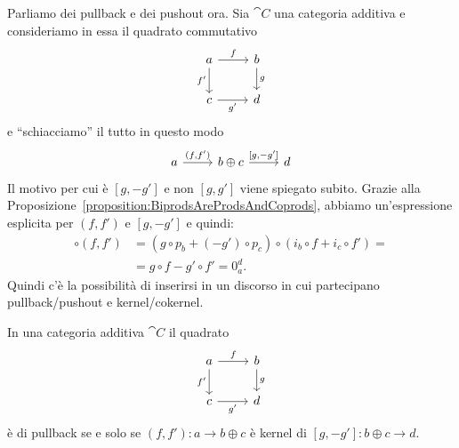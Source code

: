 Parliamo dei pullback e dei pushout ora. Sia \(\cat C\) una categoria
additiva e consideriamo in essa il quadrato commutativo
\[
  \begin{tikzcd}
    a \ar["{f}", r] \ar["{f'}", d, swap] & b \ar["{g}", d] \\
    c \ar["{g'}", r, swap] & d
  \end{tikzcd}
\]
e ``schiacciamo'' il tutto in questo modo
\[
  \begin{tikzcd}
    a \ar["{(f, f')}", r] & b \oplus c \ar["{[g, -g']}", r] & d
  \end{tikzcd}
\]
Il motivo per cui è \([g, -g']\) e non \([g, g']\) viene spiegato
subito. Grazie alla
Proposizione~\ref{proposition:BiprodsAreProdsAndCoprods}, abbiamo
un'espressione esplicita per \((f,f')\) e \([g,-g']\) e quindi:
\begin{align*} [g, -g'] \circ (f, f') &= (g \circ p_b + (-g') \circ p_c)
  \circ (i_b
                                        \circ f + i_c \circ f') = \\
                                      &= g \circ f - g' \circ f' = 0_a^d
                                        .
\end{align*}
Quindi c'è la possibilità di inserirsi in un discorso in cui partecipano
pullback/pushout e kernel/cokernel.

\begin{proposition}\label{proposition:FromPullbackToKernel}
  In una categoria additiva \(\cat C\) il quadrato
  \[
    \begin{tikzcd}
      a \ar["{f}", r] \ar["{f'}", d, swap] & b \ar["{g}", d] \\
      c \ar["{g'}", r, swap] & d
    \end{tikzcd}
  \]
  è di pullback se e solo se \((f, f') : a \to b \oplus c\) è kernel di
  \([g, -g'] : b \oplus c \to d\).
\end{proposition}

